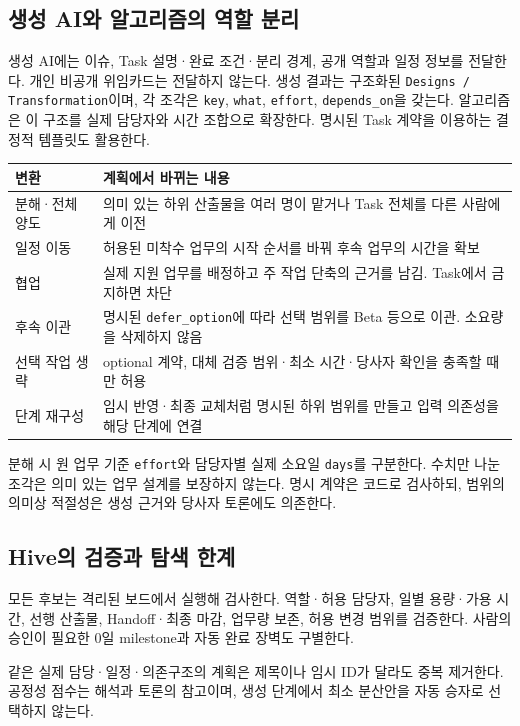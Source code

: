 \documentclass[11pt,a4paper]{article}
\begin{document}
\subsection{생성 AI와 알고리즘의 역할 분리}
생성 AI에는 이슈, Task 설명·완료 조건·분리 경계, 공개 역할과 일정 정보를 전달한다. 개인 비공개 위임카드는 전달하지 않는다. 생성 결과는 구조화된 \texttt{Designs / Transformation}이며, 각 조각은 \texttt{key}, \texttt{what}, \texttt{effort}, \texttt{depends\_on}을 갖는다. 알고리즘은 이 구조를 실제 담당자와 시간 조합으로 확장한다. 명시된 Task 계약을 이용하는 결정적 템플릿도 활용한다.

\begin{tabularx}{\linewidth}{@{}p{28mm}Y@{}}\toprule
변환 & 계획에서 바뀌는 내용\\\midrule
분해·전체 양도 & 의미 있는 하위 산출물을 여러 명이 맡거나 Task 전체를 다른 사람에게 이전\\
일정 이동 & 허용된 미착수 업무의 시작 순서를 바꿔 후속 업무의 시간을 확보\\
협업 & 실제 지원 업무를 배정하고 주 작업 단축의 근거를 남김. Task에서 금지하면 차단\\
후속 이관 & 명시된 \texttt{defer\_option}에 따라 선택 범위를 Beta 등으로 이관. 소요량을 삭제하지 않음\\
선택 작업 생략 & optional 계약, 대체 검증 범위·최소 시간·당사자 확인을 충족할 때만 허용\\
단계 재구성 & 임시 반영·최종 교체처럼 명시된 하위 범위를 만들고 입력 의존성을 해당 단계에 연결\\\bottomrule
\end{tabularx}

분해 시 원 업무 기준 \texttt{effort}와 담당자별 실제 소요일 \texttt{days}를 구분한다. 수치만 나눈 조각은 의미 있는 업무 설계를 보장하지 않는다. 명시 계약은 코드로 검사하되, 범위의 의미상 적절성은 생성 근거와 당사자 토론에도 의존한다.

\subsection{Hive의 검증과 탐색 한계}
모든 후보는 격리된 보드에서 실행해 검사한다. 역할·허용 담당자, 일별 용량·가용 시간, 선행 산출물, Handoff·최종 마감, 업무량 보존, 허용 변경 범위를 검증한다. 사람의 승인이 필요한 0일 milestone과 자동 완료 장벽도 구별한다.

같은 실제 담당·일정·의존구조의 계획은 제목이나 임시 ID가 달라도 중복 제거한다. 공정성 점수는 해석과 토론의 참고이며, 생성 단계에서 최소 분산안을 자동 승자로 선택하지 않는다.
\end{document}
